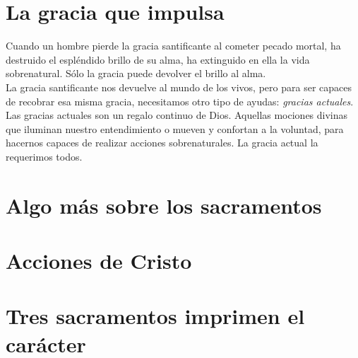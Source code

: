 \documentclass{article}
\begin{document}
    \section*{La gracia que impulsa}
       Cuando un hombre pierde la gracia santificante al cometer pecado mortal, ha destruido el espléndido brillo de su alma, ha extinguido en ella la vida sobrenatural. Sólo la gracia puede devolver el brillo al alma.\\ 
       La gracia santificante nos devuelve al mundo de los vivos, pero para ser capaces de recobrar esa misma gracia, necesitamos otro tipo de ayudas: \textit{gracias actuales}.\\ 
       Las gracias actuales son un regalo continuo de Dios. Aquellas mociones divinas que iluminan nuestro entendimiento o mueven y confortan a la voluntad, para hacernos capaces de realizar acciones sobrenaturales. La gracia actual la requerimos todos.
    \section*{Algo más sobre los sacramentos}
       
    \section*{Acciones de Cristo}

    \section*{Tres sacramentos imprimen el carácter}
\end{document}
